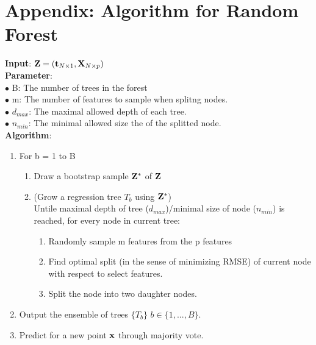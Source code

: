 \documentclass[11pt]{article}
\theoremstyle{definition}
\begin{document}
\section*{\textbf{Appendix: Algorithm for Random Forest}}
\textbf{Input}: ${\bf Z} = ({\bf t}_{N \times 1}, {\bf X}_{N \times p})$\\

\textbf{Parameter}:\\
$\bullet$ B: The number of trees in the forest\\
$\bullet$ m: The number of features to sample when splitng nodes.\\
$\bullet$ $d_{max}$: The maximal allowed depth of each tree. \\
$\bullet$ $n_{min}$: The minimal allowed size the of the splitted node.\\

\textbf{Algorithm}:
\begin{enumerate}
\item For b = 1 to B
	\begin{enumerate}
	\item Draw a bootstrap sample ${\bf Z}^*$ of ${\bf Z}$
	\item (Grow a regression tree $T_b$ using ${\bf Z}^*$)\\
	Untile maximal depth of tree ($d_{max}$)/minimal size of node ($n_{min}$) is reached, for every node in current tree:
	\begin{enumerate}
		\item Randomly sample m features from the p features
		\item Find optimal split (in the sense of minimizing RMSE) of current node with respect to select features.
		\item Split the node into two daughter nodes.
	\end{enumerate}
	\end{enumerate}
\item Output the ensemble of trees $\{T_b\}$ $b \in \{1, ..., B\}$.
\item Predict for a new point ${\bf x}$ through majority vote.
\end{enumerate}
\end{document}
